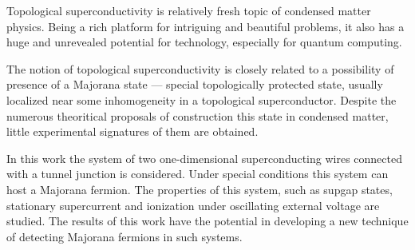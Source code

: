 Topological superconductivity is relatively fresh topic of condensed matter physics. Being a rich platform for intriguing and beautiful problems, it also has a huge and unrevealed potential for technology, especially for quantum computing.

The notion of topological superconductivity is closely related to a possibility of presence of a Majorana state --- special topologically protected state, usually localized near some inhomogeneity in a topological superconductor. Despite  the numerous theoritical proposals of construction this state in condensed matter, little experimental signatures of them are obtained.

In this work the system of two one-dimensional superconducting wires connected with a tunnel junction is considered. Under special conditions this system can host a Majorana fermion. The properties of this system, such as supgap states, stationary supercurrent and ionization under  oscillating external voltage are studied. The results of this work have the potential in developing a new technique of detecting Majorana fermions in such systems.

